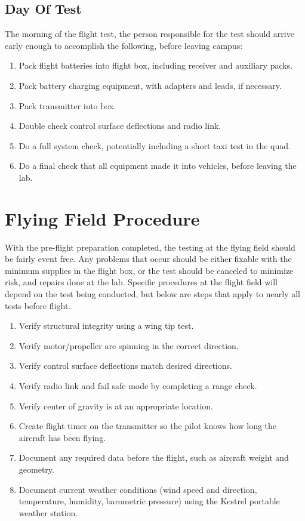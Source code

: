 \subsection{Day Of Test}
The morning of the flight test, the person responsible for the test should arrive early enough to accomplish the following, before leaving campus:
\begin{enumerate}
\item Pack flight batteries into flight box, including receiver and auxiliary packs.
\item Pack battery charging equipment, with adapters and leads, if necessary.
\item Pack transmitter into box.
\item Double check control surface deflections and radio link.
\item Do a full system check, potentially including a short taxi test in the quad.
\item Do a final check that all equipment made it into vehicles, before leaving the lab.
\end{enumerate}

\section{Flying Field Procedure}
With the pre-flight preparation completed, the testing at the flying field should be fairly event free. Any problems that occur should be either fixable with the minimum supplies in the flight box, or the test should be canceled to minimize risk, and repairs done at the lab. Specific procedures at the flight field will depend on the test being conducted, but below are steps that apply to nearly all tests before flight.
\begin{enumerate}
\item Verify structural integrity using a wing tip test.
\item Verify motor/propeller are spinning in the correct direction.
\item Verify control surface deflections match desired directions.
\item Verify radio link and fail safe mode by completing a range check.
\item Verify center of gravity is at an appropriate location.
\item Create flight timer on the transmitter so the pilot knows how long the aircraft has been flying.
\item Document any required data before the flight, such as aircraft weight and geometry.
\item Document current weather conditions (wind speed and direction, temperature, humidity, barometric pressure) using the Kestrel portable weather station.
\end{enumerate}

